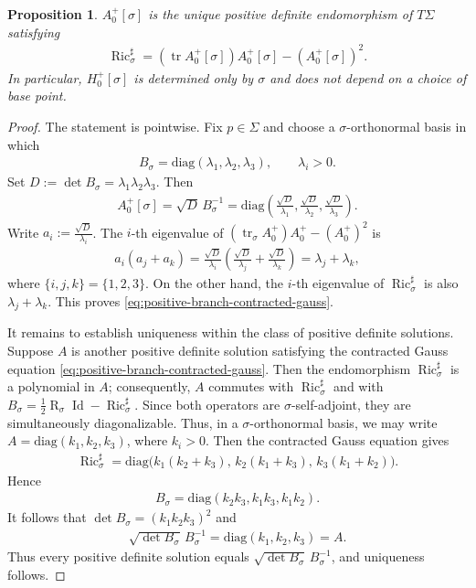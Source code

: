 \documentclass[10pt]{amsart}
\newcommand{\tr}{\operatorname{tr}}
\newcommand{\Ric}{\operatorname{Ric}}
\newcommand{\Id}{\operatorname{Id}}
\newcommand{\Scal}{\operatorname{R}}
\newcommand{\diag}{\mathrm{diag}}
\theoremstyle{plain}
\newtheorem{proposition}[theorem]{Proposition}
\theoremstyle{remark}
\begin{document}
	\begin{proposition}\label{prop:positive-reference-branch}
		$A_0^+[\sigma]$ is the unique positive definite endomorphism of $T\Sigma$
		satisfying
		\begin{align}\label{eq:positive-branch-contracted-gauss}
			\Ric_\sigma^\sharp
			=
			(\tr A_0^+[\sigma])A_0^+[\sigma]
			-
			(A_0^+[\sigma])^2 .
		\end{align}
		In particular, $H_0^+[\sigma]$ is determined only by $\sigma$ and does not
		depend on a choice of base point.
	\end{proposition}
	
	\begin{proof}
		The statement is pointwise. Fix $p\in\Sigma$ and choose a
		$\sigma$-orthonormal basis in which
		\begin{align*}
			B_\sigma
			=
			\diag(\lambda_1,\lambda_2,\lambda_3),
			\qquad
			\lambda_i>0 .
		\end{align*}
		Set $D:=\det B_\sigma=\lambda_1\lambda_2\lambda_3$. Then
		\begin{align*}
			A_0^+[\sigma]
			=
			\sqrt D\,B_\sigma^{-1}
			=
			\diag\left(
			\frac{\sqrt D}{\lambda_1},
			\frac{\sqrt D}{\lambda_2},
			\frac{\sqrt D}{\lambda_3}
			\right).
		\end{align*}
		Write $a_i:=\tfrac{\sqrt D}{\lambda_i}$. The $i$-th eigenvalue of
		$(\tr_\sigma A_0^+)A_0^+-(A_0^+)^2$ is
		\begin{align*}
			a_i(a_j+a_k)
			=
			\frac{\sqrt D}{\lambda_i}
			\left(
			\frac{\sqrt D}{\lambda_j}
			+
			\frac{\sqrt D}{\lambda_k}
			\right)
			=
			\lambda_j+\lambda_k,
		\end{align*}
		where $\{i,j,k\}=\{1,2,3\}$. On the other hand, the $i$-th eigenvalue of $\Ric_\sigma^\sharp$ is also
		$\lambda_j+\lambda_k$. This proves \eqref{eq:positive-branch-contracted-gauss}.
		
		It remains to establish uniqueness within the class of positive definite solutions. Suppose $A$ is another positive definite solution satisfying the contracted Gauss equation \eqref{eq:positive-branch-contracted-gauss}. Then the endomorphism $\Ric_\sigma^\sharp$ is a polynomial in $A$; consequently, $A$ commutes with $\Ric_\sigma^\sharp$ and with $B_\sigma=\frac12\Scal_\sigma\Id-\Ric_\sigma^\sharp$. Since both operators are $\sigma$-self-adjoint, they are simultaneously diagonalizable. Thus, in a $\sigma$-orthonormal basis, we may write $A=\diag(k_1,k_2,k_3)$, where $k_i>0$. Then the contracted Gauss equation gives
		\begin{align*}
			\Ric_\sigma^\sharp
			=
			\diag\bigl(k_1(k_2+k_3),\,k_2(k_1+k_3),\,k_3(k_1+k_2)\bigr).
		\end{align*}
		Hence
		\begin{align*}
			B_\sigma
			=
			\diag(k_2k_3,k_1k_3,k_1k_2).
		\end{align*}
		It follows that $\det B_\sigma=(k_1k_2k_3)^2$ and
		\begin{align*}
			\sqrt{\det B_\sigma}\,B_\sigma^{-1}
			=
			\diag(k_1,k_2,k_3)=A .
		\end{align*}
		Thus every positive definite solution equals
		$\sqrt{\det B_\sigma}\,B_\sigma^{-1}$, and uniqueness follows.
	\end{proof}
	
\end{document}
